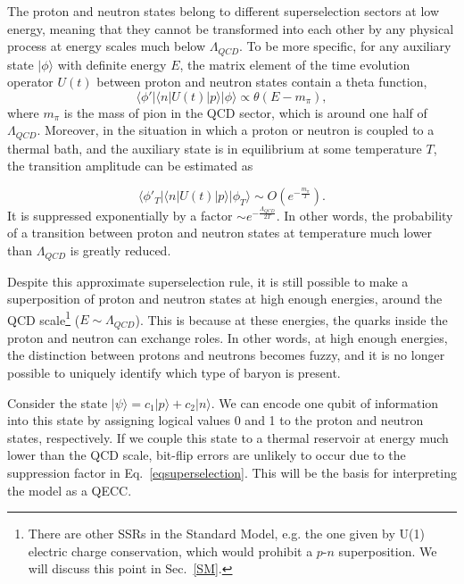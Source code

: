 \documentclass[11pt,english]{article}
\newcommand{\Sec}[1]{Sec.~\ref{#1}}
\begin{document}
The proton and neutron states belong to different superselection sectors at low energy, meaning that they cannot be transformed into each other by any physical process at energy scales much below $\Lambda_{QCD}$. To be more specific, for any auxiliary state $|\phi\rangle$ with definite energy $E$, the matrix element of the time evolution operator $U(t)$ between proton and neutron states contain a theta function,
\begin{equation}\label{theta}
    \langle\phi'| \langle n|U(t)|p\rangle|\phi\rangle\propto \theta(E-m_{\pi}),
\end{equation}
where $m_{\pi}$ is the mass of pion in the QCD sector, which is around one half of $\Lambda_{QCD}$. Moreover, in the situation in which a proton or neutron is coupled to a thermal bath, and the auxiliary state is in equilibrium at some temperature $T$, the transition amplitude can be estimated as 


\begin{equation}\label{eqsuperselection}
   \langle\phi'_T| \langle n|U(t)|p\rangle|\phi_T\rangle\sim O(e^{-\frac{m_{\pi}}{T}}).
\end{equation}
It is suppressed exponentially by a factor $\sim e^{-\frac{\Lambda_{QCD}}{2T}}$. In other words, the probability of a transition between proton and neutron states at temperature  much lower than $\Lambda_{QCD}$ is greatly reduced.


Despite  this approximate superselection rule, it is still possible to make a superposition of proton and neutron states at high enough energies, around the QCD scale\footnote{There are other SSRs in the Standard Model, e.g. the one given by U(1) electric charge conservation, which would prohibit a $p$-$n$ superposition. We will discuss this point in \Sec{SM}.} ($E\sim\Lambda_{QCD}$). This is because at these energies, the quarks inside the proton and neutron can exchange roles. In other words, at high enough energies, the distinction between protons and neutrons becomes fuzzy, and it is no longer possible to uniquely identify which type of baryon is present.

Consider the state $|\psi\rangle=c_1|p\rangle+c_2|n\rangle$. We can encode one qubit of information into this state by assigning logical values 0 and 1 to the proton and neutron states, respectively. 
If we couple this state to a  thermal reservoir at energy much lower than the QCD scale, bit-flip errors are unlikely to occur due to the suppression factor in Eq.~\eqref{eqsuperselection}.
This will be the basis for interpreting the model as a QECC.
\end{document}

